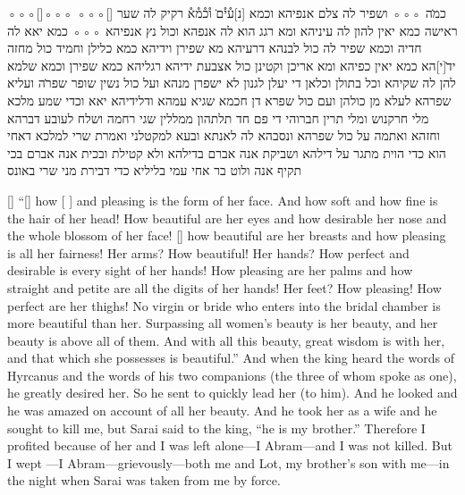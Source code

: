 \begin{aramaictext}
    ◦◦◦[\hspace{3em}]◦◦◦
    ◦◦◦[\hspace{9em}] כמ̇ה ◦◦◦ ושפיר לה צלם אנפיהא וכמא
    [נ]ע֯י֯ם̇ ו֯כ֯מ֯א֯ רקיק לה שער ראישה כמא יאין להון לה עיניהא ומא רגג הוא
    לה אנפהא וכול נץ
    אנפיהא ◦◦◦ כמא יאא לה חדיה וכמא שפיר לה כול לבנהא דרעיהא מא
    שפירן וידיהא כמא
    כלילן וחמיד כול מחזה יד̇[י]הא כמא יאין כפיהא ומא אריכן וקטינן כול
    אצבעת ידיהא רגליהא
    כמא שפירן וכמא שלמא להן לה שקיהא וכל בתולן וכלאן די יעלן לגנון
    לא ישפרן מנהא ועל כול
    נשין שופר שפר̇ה ועליא שפרהא לעלא מן כולהן ועם כול שפרא דן חכמא
    שגיא עמהא ודלידיהא
    יאא וכדי שמע מלכא מלי חרקנוש ומלי תרין חברוהי די פם חד תלתהון
    ממללין שגי רחמה ושלח
    לעובע דברהא וחזהא ואתמה על כול שפרהא ונסבהא לה לאנתא ובעא
    למקטלני ואמרת שרי
    למלכא דאחי הוא כדי הוית מתגר על דילהא ושביקת אנה אברם בדילהא
    ולא קטילת ובכית אנה
    אברם בכי תקיף אנה ולוט בר אחי עמי בליליא כדי דבירת מני שרי באונס
    \vacat
\end{aramaictext}

\begin{translation}
    [\hspace{1em}]
    ``[\hspace{1em}] how [ ] and pleasing is the form of her face. And how
    soft and how fine is the hair of her head!
    How beautiful are her eyes and how desirable her nose and the whole blossom 
    of her face! [\hspace{1em}] how beautiful are her breasts and how pleasing is all her fairness! Her arms? How beautiful! Her hands? How 
    perfect and desirable is every sight of her hands! How pleasing  are her palms and how straight and petite are all the digits of her hands! Her feet?
    How pleasing! How perfect are her thighs! No virgin or bride who enters into the bridal chamber is more beautiful than her. Surpassing all
    women's beauty is her beauty, and her beauty is above all of them. And with all this beauty, great wisdom is with her, and that which she possesses is 
    beautiful.'' And when the king heard the words of Hyrcanus and the words of his two companions (the three of whom spoke as one), he greatly desired her. So he sent
    to quickly lead her (to him). And he looked and he was amazed on account of all her beauty. And he took her as a wife and he sought to kill me, but Sarai said
    to the king, ``he is my brother.'' Therefore I profited because of her and I was left alone---I Abram---and I was not killed. But I wept
    ---I Abram---grievously---both me and Lot, my brother's son with me---in the night when Sarai was taken from me by force.
\end{translation}

